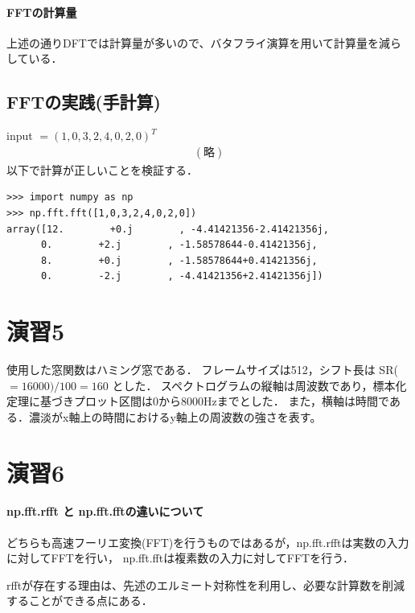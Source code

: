 \documentclass[11pt,a4j]{jarticle}%
\begin{document}
\paragraph{FFTの計算量}
上述の通りDFTでは計算量が多いので、バタフライ演算を用いて計算量を減らしている．
\subsection{FFTの実践(手計算)}
input $= (1,0,3,2,4,0,2,0)^T $
\begin{align}
(略)
\end{align}
以下で計算が正しいことを検証する．
\begin{lstlisting}[caption=FFTの実践(numpy篇),label=prog1]
>>> import numpy as np
>>> np.fft.fft([1,0,3,2,4,0,2,0])
array([12.        +0.j        , -4.41421356-2.41421356j,
      0.        +2.j        , -1.58578644-0.41421356j,
      8.        +0.j        , -1.58578644+0.41421356j,
      0.        -2.j        , -4.41421356+2.41421356j])
\end{lstlisting}

\section{演習5}
使用した窓関数はハミング窓である．
フレームサイズは512，シフト長は SR($=16000) / 100 = 160$ とした． 
スペクトログラムの縦軸は周波数であり，標本化定理に基づきプロット区間は0から8000Hzまでとした．
また，横軸は時間である．濃淡がx軸上の時間におけるy軸上の周波数の強さを表す。


\section{演習6}
\paragraph{np.fft.rfft と np.fft.fftの違いについて}
どちらも高速フーリエ変換(FFT)を行うものではあるが，np.fft.rfftは実数の入力に対してFFTを行い，
np.fft.fftは複素数の入力に対してFFTを行う．

rfftが存在する理由は、先述のエルミート対称性を利用し、必要な計算数を削減することができる点にある．
\end{document}
